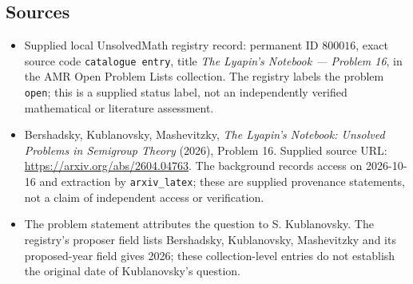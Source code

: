 \documentclass[11pt]{article}
\begin{document}
\subsection{Sources}
\begin{itemize}
\item Supplied local UnsolvedMath registry record: permanent ID \(800016\), exact source code \texttt{catalogue entry}, title \emph{The Lyapin's Notebook --- Problem 16}, in the AMR Open Problem Lists collection. The registry labels the problem \texttt{open}; this is a supplied status label, not an independently verified mathematical or literature assessment.
\item Bershadsky, Kublanovsky, Mashevitzky, \emph{The Lyapin's Notebook: Unsolved Problems in Semigroup Theory} (2026), Problem 16. Supplied source URL: \url{https://arxiv.org/abs/2604.04763}. The background records access on 2026-10-16 and extraction by \texttt{arxiv\_latex}; these are supplied provenance statements, not a claim of independent access or verification.
\item The problem statement attributes the question to S. Kublanovsky. The registry's proposer field lists Bershadsky, Kublanovsky, Mashevitzky and its proposed-year field gives 2026; these collection-level entries do not establish the original date of Kublanovsky's question.
\end{itemize}
\end{document}
